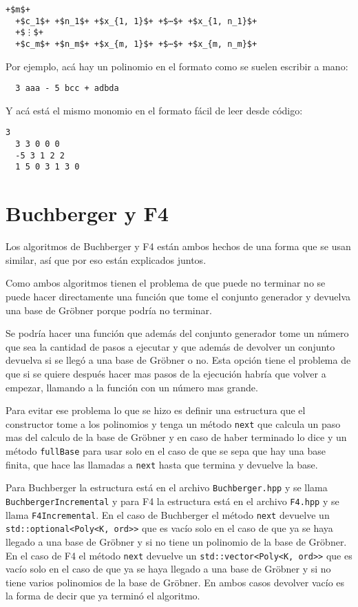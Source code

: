 \documentclass{report}
\theoremstyle{customstyle}
\theoremstyle{factstyle}
\begin{document}
\begin{lstlisting}[escapechar=+]
  +$m$+
  +$c_1$+ +$n_1$+ +$x_{1, 1}$+ +$⋯$+ +$x_{1, n_1}$+
  +$⋮$+
  +$c_m$+ +$n_m$+ +$x_{m, 1}$+ +$⋯$+ +$x_{m, n_m}$+
\end{lstlisting}

Por ejemplo, acá hay un polinomio en el formato como se suelen escribir a mano:

\begin{lstlisting}
  3 aaa - 5 bcc + adbda
\end{lstlisting}

Y acá está el mismo monomio en el formato fácil de leer desde código:

\begin{lstlisting}[escapechar=+]
  3
  3 3 0 0 0
  -5 3 1 2 2
  1 5 0 3 1 3 0
\end{lstlisting}

\section{Buchberger y F4}

Los algoritmos de Buchberger y F4 están ambos hechos de una forma que se usan similar, así que por eso están explicados juntos.

Como ambos algoritmos tienen el problema de que puede no terminar no se puede hacer directamente una función que tome el conjunto generador y devuelva una base de Gröbner porque podría no terminar.

Se podría hacer una función que además del conjunto generador tome un número que sea la cantidad de pasos a ejecutar y que además de devolver un conjunto devuelva si se llegó a una base de Gröbner o no. Esta opción tiene el problema de que si se quiere después hacer mas pasos de la ejecución habría que volver a empezar, llamando a la función con un número mas grande.

Para evitar ese problema lo que se hizo es definir una estructura que el constructor tome a los polinomios y tenga un método \texttt{next} que calcula un paso mas del calculo de la base de Gröbner y en caso de haber terminado lo dice y un método \texttt{fullBase} para usar solo en el caso de que se sepa que hay una base finita, que hace las llamadas a \texttt{next} hasta que termina y devuelve la base.

Para Buchberger la estructura está en el archivo \texttt{Buchberger.hpp} y se llama \texttt{BuchbergerIncremental} y para F4 la estructura está en el archivo \texttt{F4.hpp} y se llama \texttt{F4Incremental}. En el caso de Buchberger el método \texttt{next} devuelve un \texttt{std::optional<Poly<K, ord>>} que es vacío solo en el caso de que ya se haya llegado a una base de Gröbner y si no tiene un polinomio de la base de Gröbner. En el caso de F4 el método \texttt{next} devuelve un \texttt{std::vector<Poly<K, ord>>} que es vacío solo en el caso de que ya se haya llegado a una base de Gröbner y si no tiene varios polinomios de la base de Gröbner. En ambos casos devolver vacío es la forma de decir que ya terminó el algoritmo.
\end{document}
